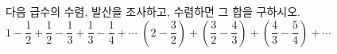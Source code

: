 다음 급수의 수렴, 발산을 조사하고, 수렴하면 그 합을 구하시오.
 $1-\dfrac{1}{2}+\dfrac{1}{2}-\dfrac{1}{3}+\dfrac{1}{3}-\dfrac{1}{4}+\cdots$
 $\left(2-\dfrac{3}{2}\right)+\left(\dfrac{3}{2}-\dfrac{4}{3}\right)+\left(\dfrac{4}{3}-\dfrac{5}{4}\right)+\cdots$
